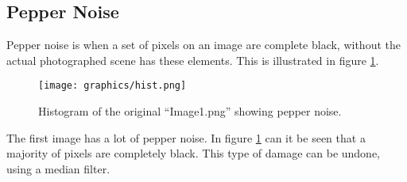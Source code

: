 

\subsection{Pepper Noise}
Pepper noise is when a set of pixels on an image are complete black, without the actual photographed scene has these elements.
This is illustrated in figure \ref{fig:hist_pepper}.



\begin{figure}[H]
\texttt{[image: graphics/hist.png]}
\caption{Histogram of the original ``Image1.png'' showing pepper noise.}
\label{fig:hist_pepper}
\end{figure}






The first image has a lot of pepper noise.
In figure \ref{fig:hist_pepper} can it be seen that a majority of pixels are completely black.
This type of damage can be undone, using a median filter.
